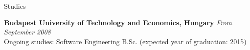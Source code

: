 \documentclass{resume} %
\begin{document}

\begin{rSection}{Studies}

{\bf Budapest University of Technology and Economics, Hungary} \hfill {\em From September 2008} \\
Ongoing studies: Software Engineering B.Sc. (expected year of graduation: 2015) \smallskip
\end{rSection}

\end{document}
